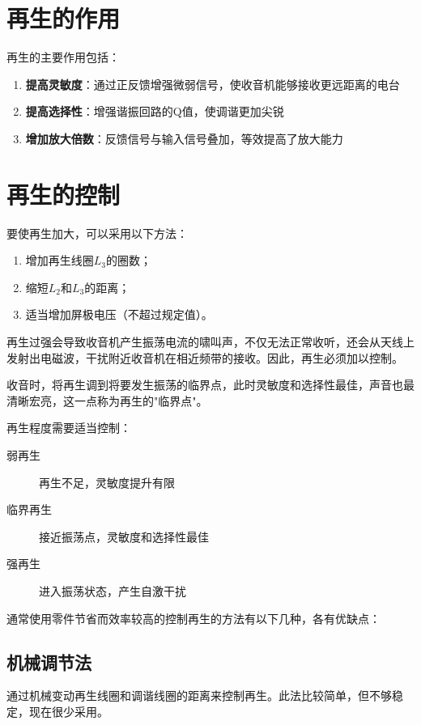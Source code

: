 \documentclass[12pt,UTF8]{ctexbook}
\begin{document}
\section{再生的作用}

再生的主要作用包括：

\begin{enumerate}
    \item \textbf{提高灵敏度}：通过正反馈增强微弱信号，使收音机能够接收更远距离的电台
    \item \textbf{提高选择性}：增强谐振回路的Q值，使调谐更加尖锐
    \item \textbf{增加放大倍数}：反馈信号与输入信号叠加，等效提高了放大能力
\end{enumerate}

\section{再生的控制}

要使再生加大，可以采用以下方法：
\begin{enumerate}
    \item 增加再生线圈$L_3$的圈数；
    \item 缩短$L_2$和$L_3$的距离；
    \item 适当增加屏极电压（不超过规定值）。
\end{enumerate}

再生过强会导致收音机产生振荡电流的啸叫声，不仅无法正常收听，还会从天线上发射出电磁波，干扰附近收音机在相近频带的接收。因此，再生必须加以控制。

收音时，将再生调到将要发生振荡的临界点，此时灵敏度和选择性最佳，声音也最清晰宏亮，这一点称为再生的"临界点"。

再生程度需要适当控制：

\begin{description}
    \item[弱再生] 再生不足，灵敏度提升有限
    \item[临界再生] 接近振荡点，灵敏度和选择性最佳
    \item[强再生] 进入振荡状态，产生自激干扰
\end{description}

通常使用零件节省而效率较高的控制再生的方法有以下几种，各有优缺点：

\subsection{机械调节法}

通过机械变动再生线圈和调谐线圈的距离来控制再生。此法比较简单，但不够稳定，现在很少采用。
\end{document}
